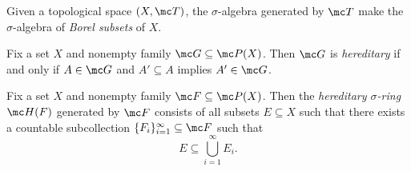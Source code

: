 \documentclass{article}
\begin{document}
\begin{example}
	Given a topological space $(X,\mc T)$, the $\sigma$-algebra generated by $\mc T$ make the $\sigma$-algebra of \textit{Borel subsets} of $X$.
\end{example}
\begin{definition}[Hereditary]
	Fix a set $X$ and nonempty family $\mc G\subseteq\mc P(X)$. Then $\mc G$ is \textit{hereditary} if and only if $A\in\mc G$ and $A'\subseteq A$ implies $A'\in\mc G$.
\end{definition}
\begin{definition}
	Fix a set $X$ and nonempty family $\mc F\subseteq\mc P(X)$. Then the \textit{hereditary $\sigma$-ring} $\mc H(F)$ generated by $\mc F$ consists of all subsets $E\subseteq X$ such that there exists a countable subcollection $\{F_i\}_{i=1}^\infty\subseteq\mc F$ such that
	\[E\subseteq\bigcup_{i=1}^\infty E_i.\]
\end{definition}
\end{document}

